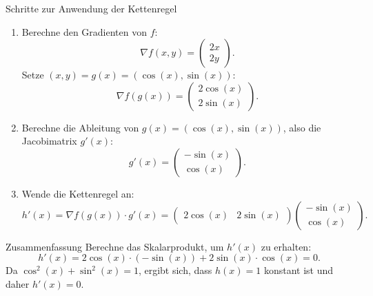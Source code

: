 \documentclass{beamer}
\begin{document}
    \begin{frame}
        \begin{block}{Schritte zur Anwendung der Kettenregel}
            \begin{enumerate}
                \item Berechne den Gradienten von \( f \):
                \[
                \nabla f(x, y) = \begin{pmatrix} 2x \\ 2y \end{pmatrix}.
                \]
                Setze \( (x, y) = g(x) = (\cos(x), \sin(x)) \):
                \[
                \nabla f(g(x)) = \begin{pmatrix} 2\cos(x) \\ 2\sin(x) \end{pmatrix}.
                \]
    
                \item Berechne die Ableitung von \( g(x) = (\cos(x), \sin(x)) \), also die Jacobimatrix \( g'(x) \):
                \[
                g'(x) = \begin{pmatrix} -\sin(x) \\ \cos(x) \end{pmatrix}.
                \]
    
                \item Wende die Kettenregel an:
                \[
                h'(x) = \nabla f(g(x)) \cdot g'(x) = \begin{pmatrix} 2\cos(x) & 2\sin(x) \end{pmatrix} \begin{pmatrix} -\sin(x) \\ \cos(x) \end{pmatrix}.
                \]
            \end{enumerate}
        \end{block}
    \end{frame}
    
    \begin{frame}
        \begin{block}{Zusammenfassung}
            Berechne das Skalarprodukt, um \( h'(x) \) zu erhalten:
            \[
            h'(x) = 2\cos(x) \cdot (-\sin(x)) + 2\sin(x) \cdot \cos(x) = 0.
            \]
            Da \( \cos^2(x) + \sin^2(x) = 1 \), ergibt sich, dass \( h(x) = 1 \) konstant ist und daher \( h'(x) = 0 \).
        \end{block}
    \end{frame}
    
\end{document}
